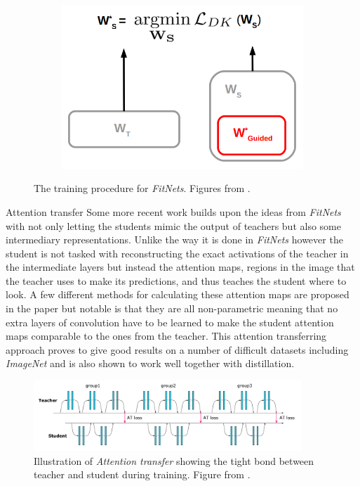 \documentclass{kththesis}
\newcommand{\bibentry}[1]{\parencite{#1}}
\newcommand{\subsubsubsection}{}
\begin{document}
\begin{figure}[h]
    \begin{subfigure}[b]{0.3\textwidth}
        \includegraphics[width=\textwidth]{FitNet_C}
      \end{subfigure}
      \caption{The training procedure for \textit{FitNets}. Figures from \textcite[]{romero2014fitnets}.}\label{fig:FitNets}
      \label{fig:FitNet}
\end{figure}

\subsubsubsection{Attention transfer}
Some more recent work \bibentry{zagouruyko2017paying} builds upon the ideas from
\emph{FitNets} with not only letting the students mimic the output of teachers
but also some intermediary representations. Unlike the way it is done in
\emph{FitNets} however the student is not tasked with reconstructing the exact
activations of the teacher in the intermediate layers but instead the attention
maps, regions in the image that the teacher uses to make its predictions, and
thus teaches the student where to look. A few different methods for calculating
these attention maps are proposed in the paper but notable is that they are all
non-parametric meaning that no extra layers of convolution have to be learned to
make the student attention maps comparable to the ones from the teacher. This
attention transferring approach proves to give good results on a number of
difficult datasets including \emph{ImageNet} and is also shown to work well
together with distillation. 

\begin{figure}[h]
  \centering
  \includegraphics[width=0.9\textwidth]{AttentionTransfer}
  \caption{Illustration of \textit{Attention transfer} showing the tight bond
    between teacher and student during training. Figure from \textcite[]{zagouruyko2017paying}.}
  \label{fig:AttentionTransfer}
\end{figure}
\end{document}
